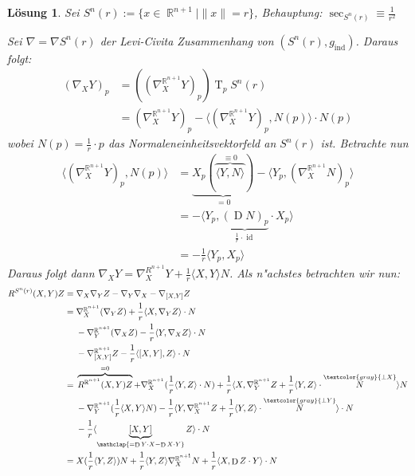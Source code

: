 \documentclass[paper=A4, twoside, chapterprefix=true, bibliography=totoc, headsepline]{scrbook}
\DeclareMathOperator{\R}{\mathbb{R}}
\DeclareMathOperator{\id}{id} %
\DeclareMathOperator{\D}{D} %
\DeclareMathOperator{\T}{T} %
\theoremstyle{plain}
\theoremstyle{nonumberplain}
\theoremstyle{empty}
\theoremstyle{break}
\newtheorem{Loes}{L\"osung}
\begin{document}
\begin{Loes}
Sei $S^n(r) := \{x \in \R^{n+1} \mid \|x\| = r\}$, \emph{Behauptung:} $\sec_{S^n(r)} \equiv \frac{1}{r^2}$

Sei $\nabla = \nabla S^n(r)$ der Levi-Civita Zusammenhang von $(S^n(r), g_{\text{ind}})$. Daraus folgt:
\begin{align*}
	(\nabla_X Y)_p &= \left( (\nabla_X^{\R^{n+1}} Y)_p \right) \T_p S^n(r) \\
	&= (\nabla_X^{\R^{n+1}} Y)_p - \langle (\nabla_X^{\R^{n+1}} Y)_p, N(p) \rangle \cdot N(p)
\end{align*}
wobei $N(p) = \frac{1}{r} \cdot p$ das Normaleneinheitsvektorfeld an $S^n(r)$ ist. Betrachte nun
\begin{align*}
	\langle (\nabla_X^{\R^{n+1}} Y)_p, N(p) \rangle &= \underbrace{X_p ( \overbrace{\langle Y, N \rangle}^{\equiv 0} )}_{=0} - \langle Y_p, (\nabla_X^{\R^{n+1}} N)_p \rangle\\
	&= - \langle Y_p, \underbrace{(\D N)_p}_{\frac{1}{r}\cdot\id} \cdot X_p \rangle\\
	&= - \frac{1}{r} \langle Y_p, X_p \rangle
\end{align*}
Daraus folgt dann $\nabla_XY = \nabla_X^{R^{n+1}} Y + \frac{1}{r} \langle X, Y \rangle N$. Als n"achstes betrachten wir nun:
\begin{align*}
	R^{S^n(r)}(X,Y)Z ={}& \nabla_X \nabla_Y Z - \nabla_Y \nabla_X - \nabla_{[X,Y]}Z\\
	={}& \nabla_X^{\R^{n+1}} (\nabla_Y Z) + \frac{1}{r} \langle X, \nabla_Y Z \rangle \cdot N\\
		& - \nabla_Y^{\R^{n+1}} (\nabla_X Z) - \frac{1}{r} \langle Y, \nabla_X Z \rangle \cdot N\\
		& - \nabla_{[X,Y]}^{\R^{n+1}} Z - \frac{1}{r} \langle [X,Y], Z \rangle \cdot N\\
	={}& \overbrace{R^{\R^{n+1}} (X,Y)Z}^{=0} + \nabla_X^{\R^{n+1}} (\frac{1}{r} \langle Y, Z \rangle \cdot N) + \frac{1}{r} \langle X, \nabla_Y^{\R^{n+1}} Z + \frac{1}{r} \langle Y, Z \rangle \cdot \overset{\textcolor{gray}{\perp X}}{N} \rangle N\\
		& - \nabla_Y^{\R^{n+1}} ( \frac{1}{r} \langle X, Y \rangle N) - \frac{1}{r} \langle Y, \nabla_X^{\R^{n+1}} Z + \frac{1}{r} \langle Y, Z \rangle \cdot \overset{\textcolor{gray}{\perp Y}}{N} \rangle \cdot N\\
		& - \frac{1}{r} \langle \underbrace{[X,Y]}_{\mathclap{=\D Y \cdot X - \D X \cdot Y}} Z \rangle \cdot N\\
	={}& X(\frac{1}{r} \langle Y, Z \rangle) N + \frac{1}{r} \langle Y, Z \rangle \nabla_X^{\R^{n+1}} N + \frac{1}{r} \langle X, \D Z \cdot Y \rangle \cdot N\\

\end{align*}
\end{Loes}
\end{document}
